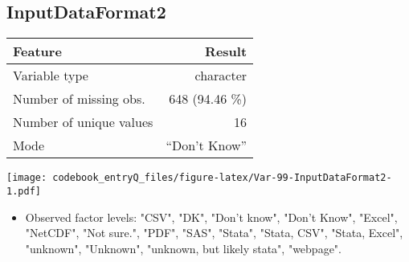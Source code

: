 \documentclass[]{article}
\providecommand{\tightlist}{%
  \setlength{\itemsep}{0pt}\setlength{\parskip}{0pt}}
\newcommand{\fullline}{\noindent\makebox[\linewidth]{\rule{\textwidth}{0.4pt}}}
\newcommand{\bminione}{\begin{minipage}{0.75 \textwidth}}
\newcommand{\bminitwo}{\begin{minipage}{0.25 \textwidth}}
\newcommand{\emini}{\end{minipage}}
\begin{document}
\fullline

\hypertarget{inputdataformat2}{\subsection{InputDataFormat2}\label{inputdataformat2}}

\bminione

\begin{longtable}[]{@{}lr@{}}
\toprule
\begin{minipage}[b]{0.34\columnwidth}\raggedright\strut
Feature\strut
\end{minipage} & \begin{minipage}[b]{0.20\columnwidth}\raggedleft\strut
Result\strut
\end{minipage}\tabularnewline
\midrule
\endhead
\begin{minipage}[t]{0.34\columnwidth}\raggedright\strut
Variable type\strut
\end{minipage} & \begin{minipage}[t]{0.20\columnwidth}\raggedleft\strut
character\strut
\end{minipage}\tabularnewline
\begin{minipage}[t]{0.34\columnwidth}\raggedright\strut
Number of missing obs.\strut
\end{minipage} & \begin{minipage}[t]{0.20\columnwidth}\raggedleft\strut
648 (94.46 \%)\strut
\end{minipage}\tabularnewline
\begin{minipage}[t]{0.34\columnwidth}\raggedright\strut
Number of unique values\strut
\end{minipage} & \begin{minipage}[t]{0.20\columnwidth}\raggedleft\strut
16\strut
\end{minipage}\tabularnewline
\begin{minipage}[t]{0.34\columnwidth}\raggedright\strut
Mode\strut
\end{minipage} & \begin{minipage}[t]{0.20\columnwidth}\raggedleft\strut
``Don't Know''\strut
\end{minipage}\tabularnewline
\bottomrule
\end{longtable}

\emini
\bminitwo
\texttt{[image: codebook\_entryQ\_files/figure-latex/Var-99-InputDataFormat2-1.pdf]}
\emini

\begin{itemize}
\tightlist
\item
  Observed factor levels: "CSV", "DK", "Don't know", "Don't Know",
  "Excel", "NetCDF", "Not sure.", "PDF", "SAS", "Stata", "Stata, CSV",
  "Stata, Excel", "unknown", "Unknown", "unknown, but likely stata",
  "webpage".
\end{itemize}
\end{document}
